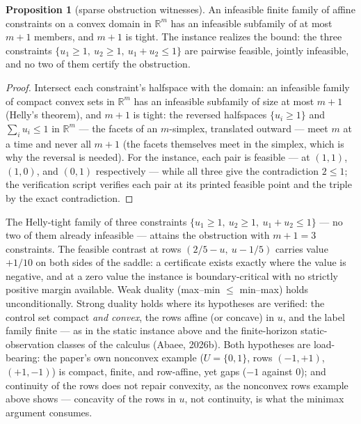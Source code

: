 \documentclass[10pt,twocolumn]{article}
\theoremstyle{definition}
\newtheorem{proposition}{Proposition}
\begin{document}
\begin{proposition}[sparse obstruction witnesses]\label{prop:helly}
An infeasible finite family of affine constraints on a convex domain in
\(\mathbb{R}^m\) has an infeasible subfamily of at most \(m + 1\)
members, and \(m + 1\) is tight. The instance realizes the bound: the
three constraints \(\{u_1 \ge 1,\ u_2 \ge 1,\ u_1 + u_2 \le 1\}\)
are pairwise feasible, jointly infeasible, and no two of them certify
the obstruction.
\end{proposition}

\begin{proof}
Intersect each constraint's halfspace with the domain: an infeasible
family of compact convex sets in \(\mathbb{R}^m\) has an infeasible
subfamily of size at most \(m + 1\) (Helly's theorem), and \(m + 1\)
is tight: the reversed halfspaces \(\{u_i \ge 1\}\) and
\(\sum_i u_i \le 1\) in \(\mathbb{R}^m\) --- the facets of an
\(m\)-simplex, translated outward --- meet \(m\) at a time and never
all \(m+1\) (the facets themselves meet in the simplex, which is why
the reversal is needed). For the
instance, each pair is feasible --- at \((1,1)\), \((1,0)\), and
\((0,1)\) respectively --- while all three give the contradiction
\(2 \le 1\); the verification script verifies each pair at its printed
feasible point and the triple by the exact contradiction.
\end{proof}

The Helly-tight family of three constraints
\(\{u_1 \ge 1,\ u_2 \ge 1,\ u_1 + u_2 \le 1\}\) --- no two of them
already infeasible --- attains the obstruction with \(m{+}1 = 3\)
constraints. The feasible contrast at rows
\((2/5 - u,\ u - 1/5)\) carries value \(+1/10\) on both sides of the
saddle: a certificate exists exactly where the value is negative, and at
a zero value the instance is boundary-critical with no strictly positive
margin available.
Weak duality (max--min \(\le\) min--max) holds unconditionally. Strong duality holds where its hypotheses are verified: the control set compact \emph{and convex}, the rows affine (or concave) in \(u\), and the label family finite --- as in the static instance above and the finite-horizon static-observation classes of the calculus (Abaee, 2026b). Both hypotheses are load-bearing: the paper's own nonconvex example (\(U = \{0,1\}\), rows \((-1,+1)\), \((+1,-1)\)) is compact, finite, and row-affine, yet gaps (\(-1\) against \(0\)); and continuity of the rows does not repair convexity, as the nonconvex rows example above shows --- concavity of the rows in \(u\), not continuity, is what the minimax argument consumes.
\end{document}
